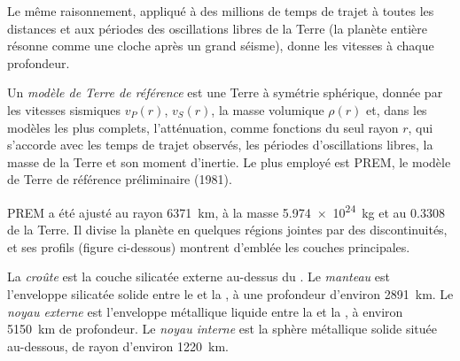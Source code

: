 Le même raisonnement, appliqué à des millions de temps de trajet à toutes les
distances et aux périodes des oscillations libres de la Terre (la planète entière
résonne comme une cloche après un grand séisme), donne les vitesses à chaque
profondeur.

\begin{definition}\label{def:b1:layered-earth:reference-model}
Un \emph{modèle de Terre de référence} est une Terre à symétrie sphérique, donnée par
les vitesses sismiques $v_P(r)$, $v_S(r)$, la masse volumique $\rho(r)$ et, dans
les modèles les plus complets, l'atténuation, comme fonctions du seul rayon $r$,
qui s'accorde avec les temps de trajet observés, les périodes d'oscillations
libres, la masse de la Terre et son moment d'inertie. Le plus employé est PREM, le
modèle de Terre de référence préliminaire (1981).
\end{definition}

PREM a été ajusté au rayon \qty{6371}{km}, à la masse
\qty{5.974e24}{kg} et au  $0.3308$ de la Terre.
Il divise la planète en quelques régions jointes par des discontinuités, et ses
profils (figure ci-dessous) montrent d'emblée les couches principales.

\begin{definition}\label{def:b1:layered-earth:layers}
La \emph{croûte} est la couche silicatée externe au-dessus du . Le
\emph{manteau} est l'enveloppe silicatée solide entre le  et
la , à une profondeur d'environ \qty{2891}{km}. Le
\emph{noyau externe} est l'enveloppe métallique liquide entre la
 et la , à environ \qty{5150}{km}
de profondeur. Le \emph{noyau interne} est la sphère métallique solide
située au-dessous, de rayon d'environ \qty{1220}{km}.
\end{definition}

